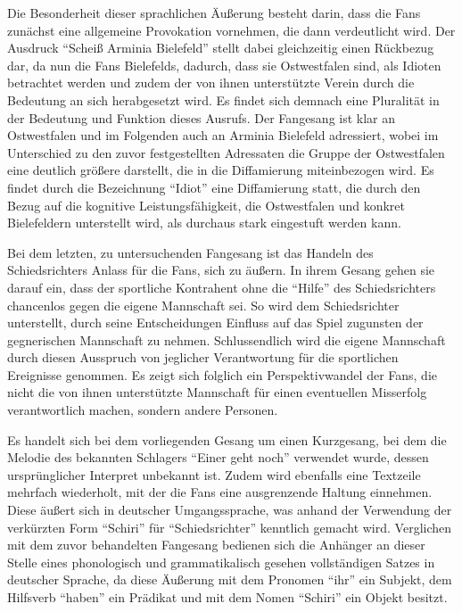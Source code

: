 Die Besonderheit dieser sprachlichen Äußerung besteht darin, dass die Fans zunächst eine allgemeine Provokation vornehmen, die dann verdeutlicht wird.
Der Ausdruck "`Scheiß Arminia Bielefeld"' stellt dabei gleichzeitig einen Rückbezug dar, da nun die Fans Bielefelds, dadurch, dass sie Ostwestfalen sind, als Idioten betrachtet werden und zudem der von ihnen unterstützte Verein durch die Bedeutung an sich herabgesetzt wird.
Es findet sich demnach eine Pluralität in der Bedeutung und Funktion dieses Ausrufs.
Der Fangesang ist klar an Ostwestfalen und im Folgenden auch an Arminia Bielefeld adressiert, wobei im Unterschied zu den zuvor festgestellten Adressaten die Gruppe der Ostwestfalen eine deutlich größere darstellt, die in die Diffamierung miteinbezogen wird.
Es findet durch die Bezeichnung "`Idiot"' eine Diffamierung statt, die durch den Bezug auf die kognitive Leistungsfähigkeit, die Ostwestfalen und konkret Bielefeldern unterstellt wird, als durchaus stark eingestuft werden kann.

Bei dem letzten, zu untersuchenden Fangesang ist das Handeln des Schiedsrichters Anlass für die Fans, sich zu äußern.
In ihrem Gesang gehen sie darauf ein, dass der sportliche Kontrahent ohne die "`Hilfe"' des Schiedsrichters chancenlos gegen die eigene Mannschaft sei.
So wird dem Schiedsrichter unterstellt, durch seine Entscheidungen Einfluss auf das Spiel zugunsten der gegnerischen Mannschaft zu nehmen.
Schlussendlich wird die eigene Mannschaft durch diesen Ausspruch von jeglicher Verantwortung für die sportlichen Ereignisse genommen.
Es zeigt sich folglich ein Perspektivwandel der Fans, die nicht die von ihnen unterstützte Mannschaft für einen eventuellen Misserfolg verantwortlich machen, sondern andere Personen.

Es handelt sich bei dem vorliegenden Gesang um einen Kurzgesang, bei dem die Melodie des bekannten Schlagers "`Einer geht noch"' verwendet wurde, dessen ursprünglicher Interpret unbekannt ist.
Zudem wird ebenfalls eine Textzeile mehrfach wiederholt, mit der die Fans eine ausgrenzende Haltung einnehmen.
Diese äußert sich in deutscher Umgangssprache, was anhand der Verwendung der verkürzten Form "`Schiri"' für "`Schiedsrichter"' kenntlich gemacht wird.
Verglichen mit dem zuvor behandelten Fangesang bedienen sich die Anhänger an dieser Stelle eines phonologisch und grammatikalisch gesehen vollständigen Satzes in deutscher Sprache, da diese Äußerung mit dem Pronomen "`ihr"' ein Subjekt, dem Hilfsverb "`haben"' ein Prädikat und mit dem Nomen "`Schiri"' ein Objekt besitzt.

